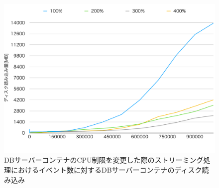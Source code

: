 \documentclass[../../../../../main]{subfiles}
\begin{document}
    \begin{figure}[H]
        \centering
        \includegraphics[width=12cm]{graph}
        \caption{DBサーバーコンテナのCPU制限を変更した際のストリーミング処理におけるイベント数に対するDBサーバーコンテナのディスク読み込み}
        \label{fig:stream-change-db-cpu-limit-db-disk-out-app_4_8192-db_1024}
    \end{figure}
\end{document}
